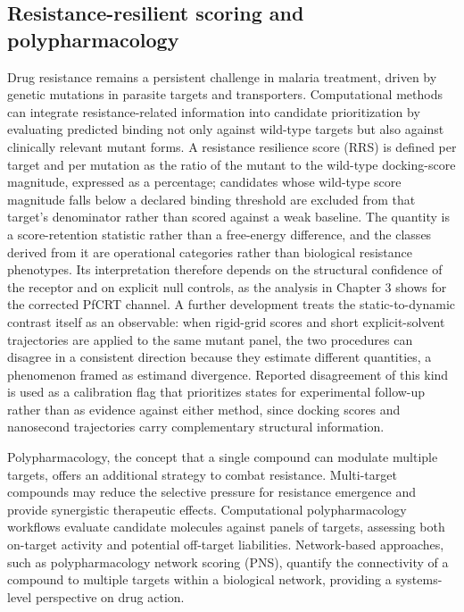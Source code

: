 \subsection{Resistance-resilient scoring and polypharmacology}

Drug resistance remains a persistent challenge in malaria treatment, driven by genetic mutations in parasite targets and transporters. Computational methods can integrate resistance-related information into candidate prioritization by evaluating predicted binding not only against wild-type targets but also against clinically relevant mutant forms. A resistance resilience score (RRS) is defined per target and per mutation as the ratio of the mutant to the wild-type docking-score magnitude, expressed as a percentage; candidates whose wild-type score magnitude falls below a declared binding threshold are excluded from that target's denominator rather than scored against a weak baseline. The quantity is a score-retention statistic rather than a free-energy difference, and the classes derived from it are operational categories rather than biological resistance phenotypes. Its interpretation therefore depends on the structural confidence of the receptor and on explicit null controls, as the analysis in Chapter 3 shows for the corrected PfCRT channel\cite{Temgoua2026Grids}. A further development treats the static-to-dynamic contrast itself as an observable: when rigid-grid scores and short explicit-solvent trajectories are applied to the same mutant panel, the two procedures can disagree in a consistent direction because they estimate different quantities, a phenomenon framed as estimand divergence. Reported disagreement of this kind is used as a calibration flag that prioritizes states for experimental follow-up rather than as evidence against either method, since docking scores and nanosecond trajectories carry complementary structural information.

Polypharmacology, the concept that a single compound can modulate multiple targets, offers an additional strategy to combat resistance. Multi-target compounds may reduce the selective pressure for resistance emergence and provide synergistic therapeutic effects. Computational polypharmacology workflows evaluate candidate molecules against panels of targets, assessing both on-target activity and potential off-target liabilities. Network-based approaches, such as polypharmacology network scoring (PNS), quantify the connectivity of a compound to multiple targets within a biological network, providing a systems-level perspective on drug action.

